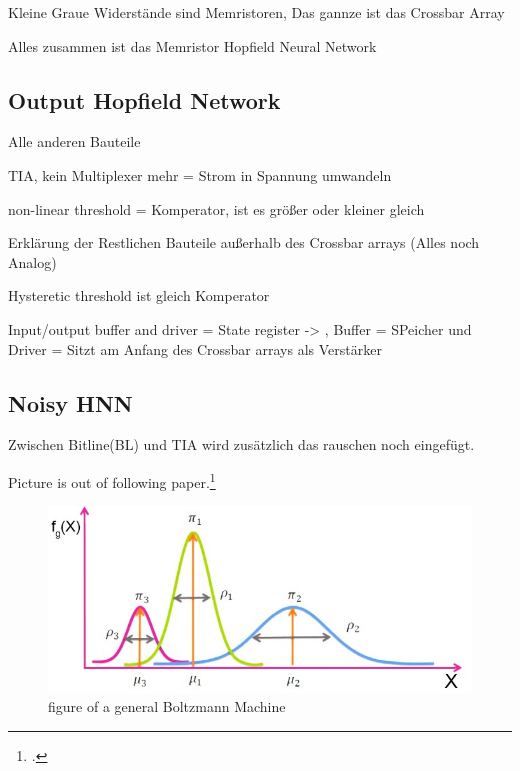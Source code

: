 Kleine Graue Widerstände sind Memristoren,
Das gannze ist das Crossbar Array

Alles zusammen ist das Memristor Hopfield Neural Network


\subsection{Output Hopfield Network}
Alle anderen Bauteile 

TIA, kein Multiplexer mehr = Strom in Spannung umwandeln 

non-linear threshold = Komperator, ist es größer oder kleiner gleich 

Erklärung der Restlichen Bauteile außerhalb des Crossbar arrays (Alles noch Analog)

Hysteretic threshold ist gleich Komperator 

Input/output buffer and driver = State register -> , Buffer = SPeicher und Driver = Sitzt am Anfang des Crossbar arrays als Verstärker 

\subsection{Noisy HNN}

Zwischen Bitline(BL) und TIA wird zusätzlich das rauschen noch eingefügt. 


Picture is out of following paper.\footcite[cf.][3]{gmComprehensiveSurveyAnalysis2020}
\begin{figure}[H]
    \centering
    \includegraphics[width=0.7\linewidth]{graphics/Gaussian_Normal_Distribution_edited.jpg}
    \caption{figure of a general Boltzmann Machine}
    \label{fig2}
\end{figure}
